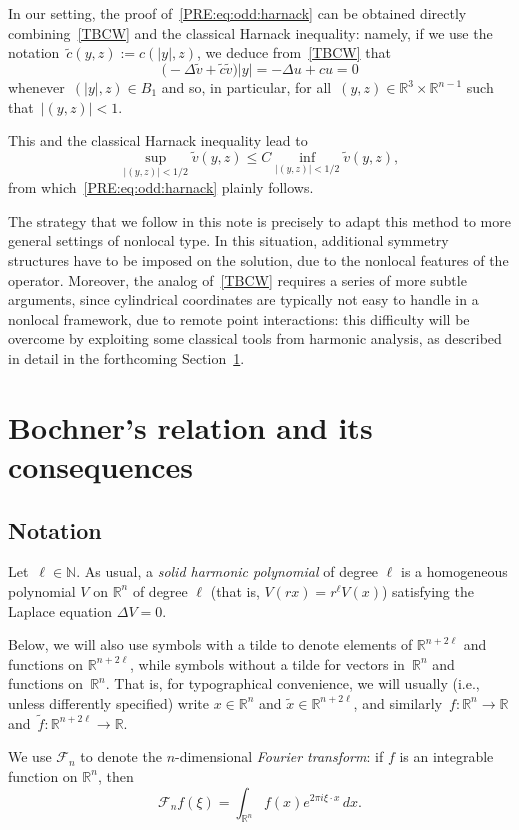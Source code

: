 \documentclass[a4paper,12pt,reqno]{amsart}
\numberwithin{equation}{section}
\theoremstyle{definition}
\theoremstyle{notation}
\newcommand{\fourier}{\mathscr{F}}
\newcommand{\R}{\mathds{R}}
\newcommand{\N}{\mathds{N}}
\renewcommand{\le}{\leqslant}
\begin{document}
In our setting, the proof of~\eqref{PRE:eq:odd:harnack} can be obtained directly combining~\eqref{TBCW} and the classical Harnack inequality: namely, if we use the notation~$\tilde c(y,z):=c(|y|,z)$, we deduce from~\eqref{TBCW}  that
$$\big(-\Delta \tilde v + \tilde c \tilde v\big)|y| =-\Delta u + c u = 0$$
whenever~$(|y|,z)\in B_1$ and so, in particular, for all~$(y,z)\in\R^3\times\R^{n-1}$ such that~$|(y,z)|<1$.


This and the classical Harnack inequality lead to
$$ \sup_{|(y,z)|<1/2} \tilde v(y,z) \le C \inf_{|(y,z)|<1/2} \tilde v(y,z),$$
from which~\eqref{PRE:eq:odd:harnack} plainly follows.


The strategy that we follow in this note is precisely to adapt this method to more general settings of nonlocal type.
In this situation, additional symmetry structures have to be imposed on the solution, due to the nonlocal features of the operator.
Moreover, the analog of~\eqref{TBCW} requires a series of more subtle arguments, since cylindrical coordinates are typically not easy to handle in a nonlocal framework, due to remote point interactions: this difficulty will be overcome by exploiting 
some classical tools from harmonic analysis, as described in detail in the forthcoming Section~\ref{sec:bochner}.


\section{Bochner's relation and its consequences}
\label{sec:bochner}


\subsection{Notation}


Let~$\ell\in\N$.
As usual, a {\em solid harmonic polynomial} of degree $\ell$ is a homogeneous polynomial $V$ on $\R^n$ of degree $\ell$ (that is, $V(r x) = r^\ell V(x)$) satisfying the Laplace equation $\Delta V = 0$.


Below, we will also use symbols with a tilde to denote elements of $\R^{n + 2 \ell}$ and functions on $\R^{n + 2 \ell}$, while symbols without a tilde for vectors in~$\R^n$ and functions on~$\R^n$. That is, for typographical convenience, we will usually (i.e., unless differently specified) write
$x\in\R^n$ and $\tilde x\in\R^{n + 2 \ell}$, and similarly~$f:\R^n\to\R$ and~$\tilde{f}:\R^{n+2\ell}\to\R$.


We use $\fourier_n$ to denote the $n$-dimensional {\em Fourier transform}: if $f$ is an integrable function on $\R^n$, then
\[
 \fourier_n f(\xi) = \int_{\R^n} f(x) e^{2\pi i \xi\cdot x}\, dx .
\]
\end{document}
